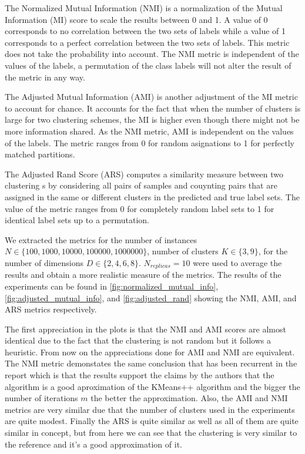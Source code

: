 The Normalized Mutual Information (NMI) is a normalization of the Mutual Information (MI) score to scale the results between 0 and 1. A value of 0 corresponds to no correlation between the two sets of labels while a value of 1 corresponds to a perfect correlation between the two sets of labels. This metric does not take the probability into account. The NMI metric is independent of the values of the labels, a permutation of the class labels will not alter the result of the metric in any way.

The Adjusted Mutual Information (AMI) is another adjustment of the MI metric to account for chance. It accounts for the fact that when the number of clusters is large for two clustering schemes, the MI is higher even though there might not be more information shared. As the NMI metric, AMI is independent on the values of the labels. The metric ranges from 0 for random asignations to 1 for perfectly matched partitions.

The Adjusted Rand Score (ARS) computes a similarity measure between two clustering s by considering all pairs of samples and couynting pairs that are assigned in the same or different clusters in the predicted and true label sets. The value of the metric ranges from 0 for completely random label sets to 1 for identical label sets up to a permutation.

We extracted the metrics for the number of instances $N \in \{100, 1000, 10000, 100000, 1000000\}$, number of clusters $K \in \{3, 9\}$, for the number of dimensions $D \in \{2, 4, 6, 8\}$. $N_{replicas}=10$ were used to average the results and obtain a more realistic measure of the metrics. The results of the experiments can be found in \ref{fig:normalized_mutual_info}, \ref{fig:adjusted_mutual_info}, and \ref{fig:adjusted_rand} showing the NMI, AMI, and ARS metrics respectively.

The first appreciation in the plots is that the NMI and AMI scores are almost identical due to the fact that the clustering is not random but it follows a heuristic. From now on the appreciations done for AMI and NMI are equivalent. The NMI metric demonstates the same conclusion that has been recurrent in the report which is that the results support the claims by the authors that the algorithm is a good aproximation of the KMeans++ algorithm and the bigger the number of iterations $m$ the better the approximation. Also, the AMI and NMI metrics are very similar due that the number of clusters used in the experiments are quite modest. Finally the ARS is quite similar as well as all of them are quite similar in concept, but from here we can see that the clustering is very similar to the reference and it's a good approximation of it.
